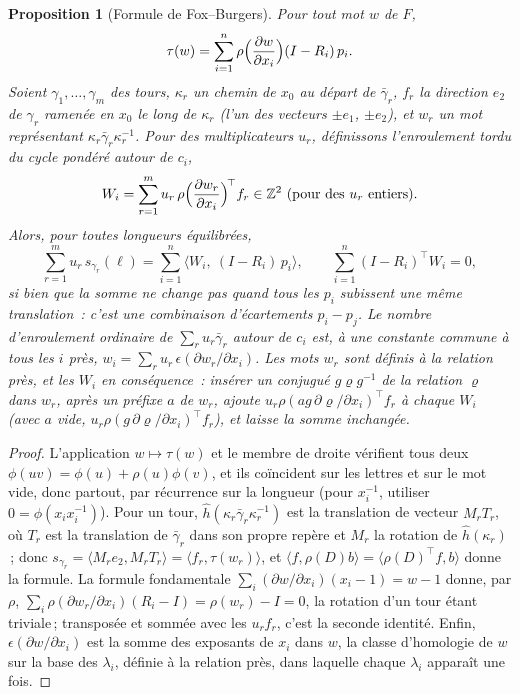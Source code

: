 \documentclass[11pt,a4paper]{article}
\newtheorem{proposition}{Proposition}
\newcommand{\Z}{\mathbb{Z}}
\newcommand{\shift}{s}
\begin{document}
\begin{proposition}[Formule de Fox--Burgers]\label{prop:fox}
Pour tout mot $w$ de $F$,
\[
  \tau(w) = \sum_{i=1}^n \rho\Bigl(\frac{\partial w}{\partial x_i}\Bigr)
  (I - R_i)\,p_i .
\]
Soient $\gamma_1, \dots, \gamma_m$ des tours, $\kappa_r$ un chemin de $x_0$
au départ de $\bar\gamma_r$, $f_r$ la direction $e_2$ de $\gamma_r$ ramenée en
$x_0$ le long de $\kappa_r$ (l'un des vecteurs $\pm e_1$, $\pm e_2$), et $w_r$
un mot représentant $\kappa_r \bar\gamma_r \kappa_r^{-1}$. Pour des
multiplicateurs $u_r$, définissons l'\emph{enroulement tordu} du cycle pondéré
autour de $c_i$,
\[
  W_i = \sum_{r=1}^m u_r\, \rho\Bigl(\frac{\partial w_r}{\partial x_i}\Bigr)^{\!\top} f_r
  \in \Z^2 \text{ (pour des } u_r \text{ entiers)} .
\]
Alors, pour toutes longueurs équilibrées,
\[
  \sum_{r=1}^m u_r\, \shift_{\gamma_r}(\ell) = \sum_{i=1}^n \bigl\langle W_i,\
  (I - R_i)\,p_i \bigr\rangle ,
  \qquad
  \sum_{i=1}^n (I - R_i)^\top W_i = 0 ,
\]
si bien que la somme ne change pas quand tous les $p_i$ subissent une même
translation~: c'est une combinaison d'écartements $p_i - p_j$. Le nombre
d'enroulement ordinaire de $\sum_r u_r \bar\gamma_r$ autour de $c_i$ est, à
une constante commune à tous les $i$ près, $w_i = \sum_r u_r\,
\epsilon(\partial w_r/\partial x_i)$. Les mots $w_r$ sont définis à la
relation près, et les $W_i$ en conséquence~: insérer un conjugué $g\varrho
g^{-1}$ de la relation $\varrho$ dans $w_r$, après un préfixe $a$ de $w_r$,
ajoute $u_r \rho(a g\, \partial \varrho/\partial x_i)^\top f_r$ à chaque $W_i$
(avec $a$ vide, $u_r \rho(g\, \partial \varrho/\partial x_i)^\top f_r$), et
laisse la somme inchangée.
\end{proposition}

\begin{proof}
L'application $w \mapsto \tau(w)$ et le membre de droite vérifient tous deux
$\phi(uv) = \phi(u) + \rho(u)\phi(v)$, et ils coïncident sur les lettres et
sur le mot vide, donc partout, par récurrence sur la longueur (pour
$x_i^{-1}$, utiliser $0 = \phi(x_i x_i^{-1})$). Pour un tour, $\hat
h(\kappa_r \bar\gamma_r \kappa_r^{-1})$ est la translation de vecteur $M_r
T_r$, où $T_r$ est la translation de $\bar\gamma_r$ dans son propre repère et
$M_r$ la rotation de $\hat h(\kappa_r)$\,; donc $\shift_{\gamma_r} = \langle
M_r e_2, M_r T_r \rangle = \langle f_r, \tau(w_r) \rangle$, et $\langle f,
\rho(D) b\rangle = \langle \rho(D)^\top f, b \rangle$ donne la formule. La
formule fondamentale $\sum_i (\partial w/\partial x_i)(x_i - 1) = w - 1$
donne, par $\rho$, $\sum_i \rho(\partial w_r/\partial x_i)(R_i - I) =
\rho(w_r) - I = 0$, la rotation d'un tour étant triviale\,; transposée et
sommée avec les $u_r f_r$, c'est la seconde identité. Enfin, $\epsilon(\partial
w/\partial x_i)$ est la somme des exposants de $x_i$ dans $w$, la classe
d'homologie de $w$ sur la base des $\lambda_i$, définie à la relation près,
dans laquelle chaque $\lambda_i$ apparaît une fois.
\end{proof}
\end{document}
